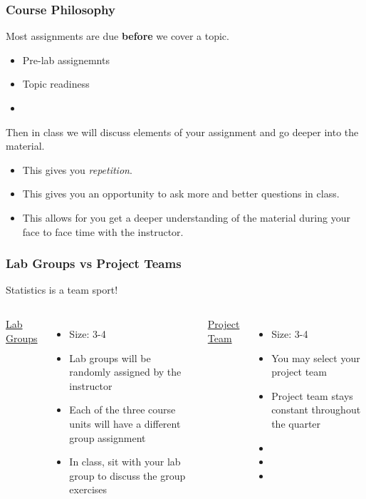 \begin{frame}
\frametitle{Course Philosophy}
Most assignments are due \textbf{before} we cover a topic.
\begin{itemize}
\item Pre-lab assignemnts
\item Topic readiness
\item[]
\end{itemize}
Then in class we will discuss elements of your assignment and go deeper into the material.
\begin{itemize}
\item This gives you \emph{repetition}.
\item This gives you an opportunity to ask more and better questions in class.
\item This allows for you get a deeper understanding of the material during your face to face time with the instructor.
\end{itemize}
\end{frame}

\begin{frame}
\frametitle{Lab Groups vs Project Teams}
\begin{center}
Statistics is a team sport!
\end{center}
\vskip10pt
\begin{columns}
\underline{Lab Groups}
\begin{itemize}
\item
Size: 3-4
\item
Lab groups will be randomly assigned by the instructor
\item
Each of the three course units will have a different group assignment
\item
In class, sit with your lab group to discuss the group exercises
\end{itemize}
\underline{Project Team}
\begin{itemize}
\item
Size: 3-4
\item
You may select your project team
\item
Project team stays constant throughout the quarter
\item[]
\item[]
\item[]
\end{itemize}
\end{columns}
\end{frame}

